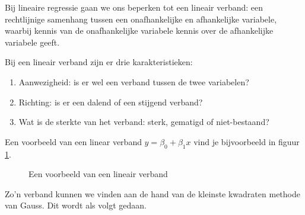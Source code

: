 Bij lineaire regressie gaan we ons beperken tot een lineair verband: een rechtlijnige samenhang tussen een onafhankelijke en afhankelijke variabele, waarbij kennis van de onafhankelijke variabele kennis over de afhankelijke variabele geeft.

Bij een lineair verband zijn er drie karakteristieken:

\begin{enumerate}
  \item Aanwezigheid: is er wel een verband tussen de twee variabelen?
  \item Richting: is er een dalend of een stijgend verband?
  \item Wat is de sterkte van het verband: sterk, gematigd of niet-bestaand?
\end{enumerate}

Een voorbeeld van een linear verband $y = \beta_{0} + \beta_{1}x$  vind je bijvoorbeeld in figuur \ref{fig:regressieFig}.

\begin{figure}[t]
  \caption{Een voorbeeld van een lineair verband}
  \label{fig:regressieFig}
\end{figure}

Zo'n verband kunnen we vinden aan de hand van de  kleinste kwadraten methode van Gauss. Dit wordt als volgt gedaan.

